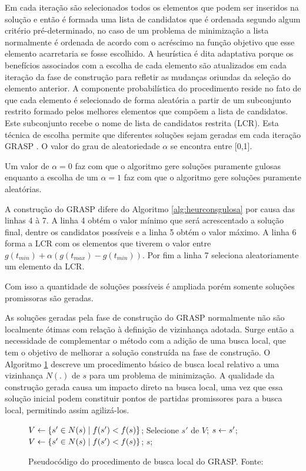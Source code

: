 Em cada iteração são selecionados todos os elementos que podem ser
inseridos na solução e então é formada uma lista de candidatos que é ordenada
segundo algum critério pré-determinado, no caso de um problema de
minimização a lista normalmente é ordenada de acordo com o acréscimo na função
objetivo que esse elemento acarretaria se fosse escolhido. A
heurística é dita adaptativa porque os benefícios associados com a escolha de
cada elemento são atualizados em cada iteração da fase de construção para
refletir as mudanças oriundas da seleção do elemento anterior. A componente
probabilística do procedimento reside no fato de que cada elemento é
selecionado de forma aleatória a partir de um subconjunto restrito formado
pelos melhores elementos que compõem a lista de candidatos. Este subconjunto
recebe o nome de lista de candidatos restrita (LCR). Esta técnica de escolha
permite que diferentes soluções sejam geradas em cada iteração GRASP
\cite{notasmarcone}. O valor do grau de aleatoriedade $\alpha$ se encontra
entre [0,1].

Um valor de $\alpha = 0$ faz com que o algoritmo gere soluções puramente
gulosas enquanto a escolha de um $\alpha = 1$ faz com que o algoritmo gere
soluções puramente aleatórias.
 
A construção do GRASP difere do Algoritmo \ref{alg:heurconsgulosa} por causa
das linhas 4 à 7. A linha 4 obtém o valor mínimo que será acrescentado a
solução final, dentre os candidatos possíveis e a linha 5 obtém o valor máximo.
A linha 6 forma a LCR com os elementos que tiverem o valor entre $g(t_{min}) +
\alpha(g(t_{max}) - g(t_{min}))$. Por fim a linha 7 seleciona aleatoriamente um
elemento da LCR.

Com isso a quantidade de soluções possíveis é ampliada porém somente soluções
promissoras são geradas.

As soluções geradas pela fase de construção do GRASP normalmente não são
localmente ótimas com relação à definição de vizinhança adotada. Surge então a
necessidade de complementar o método com a adição de uma busca local, que tem
o objetivo de melhorar a solução construída na fase de construção. O Algoritmo
\ref{alg:grasplocal} descreve um procedimento básico de busca local relativo a
uma vizinhança $N(.)$ de $s$ para um problema de minimização. A qualidade da
construção gerada causa um impacto direto na busca local, uma vez que essa
solução inicial podem constituir pontos de partidas promissores para a busca
local, permitindo assim agilizá-los.
 
\begin{figure}[h]
\caption{Pseudocódigo do procedimento de busca local do GRASP. \newline
\mbox{Fonte:
\cite{resende1995}}}\label{alg:grasplocal}
\begin{programma}
\STATE $V \leftarrow \{s{'} \in N(s) \mid f(s{'}) < f(s)\}$;
\STATE Selecione $s{'}$ de $V$;
\STATE $s \leftarrow s{'}$;
\STATE $V \leftarrow \{s{'} \in N(s) \mid f(s{'}) < f(s)\}$;
\ENDWHILE
\STATE\RETURN $s$;
\ENDALGORITHM
\end{programma}
\end{figure}

